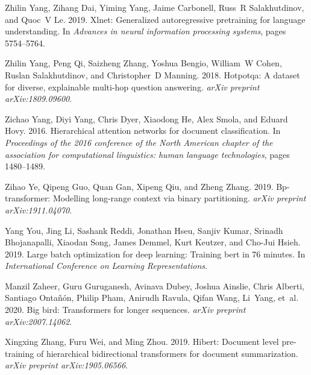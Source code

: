 \documentclass[11pt,a4paper]{article}
\begin{document}
\begin{thebibliography}{44}
Zhilin Yang, Zihang Dai, Yiming Yang, Jaime Carbonell, Russ~R Salakhutdinov,
  and Quoc~V Le. 2019.
\newblock Xlnet: Generalized autoregressive pretraining for language
  understanding.
\newblock In \emph{Advances in neural information processing systems}, pages
  5754--5764.

Zhilin Yang, Peng Qi, Saizheng Zhang, Yoshua Bengio, William~W Cohen, Ruslan
  Salakhutdinov, and Christopher~D Manning. 2018.
\newblock Hotpotqa: A dataset for diverse, explainable multi-hop question
  answering.
\newblock \emph{arXiv preprint arXiv:1809.09600}.

Zichao Yang, Diyi Yang, Chris Dyer, Xiaodong He, Alex Smola, and Eduard Hovy.
  2016.
\newblock Hierarchical attention networks for document classification.
\newblock In \emph{Proceedings of the 2016 conference of the North American
  chapter of the association for computational linguistics: human language
  technologies}, pages 1480--1489.

Zihao Ye, Qipeng Guo, Quan Gan, Xipeng Qiu, and Zheng Zhang. 2019.
\newblock Bp-transformer: Modelling long-range context via binary partitioning.
\newblock \emph{arXiv preprint arXiv:1911.04070}.

Yang You, Jing Li, Sashank Reddi, Jonathan Hseu, Sanjiv Kumar, Srinadh
  Bhojanapalli, Xiaodan Song, James Demmel, Kurt Keutzer, and Cho-Jui Hsieh.
  2019.
\newblock Large batch optimization for deep learning: Training bert in 76
  minutes.
\newblock In \emph{International Conference on Learning Representations}.

Manzil Zaheer, Guru Guruganesh, Avinava Dubey, Joshua Ainslie, Chris Alberti,
  Santiago Onta\~{n}\'{o}n, Philip Pham, Anirudh Ravula, Qifan Wang, Li~Yang,
  et~al. 2020.
\newblock Big bird: Transformers for longer sequences.
\newblock \emph{arXiv preprint arXiv:2007.14062}.

Xingxing Zhang, Furu Wei, and Ming Zhou. 2019.
\newblock Hibert: Document level pre-training of hierarchical bidirectional
  transformers for document summarization.
\newblock \emph{arXiv preprint arXiv:1905.06566}.

\end{thebibliography}
\end{document}

